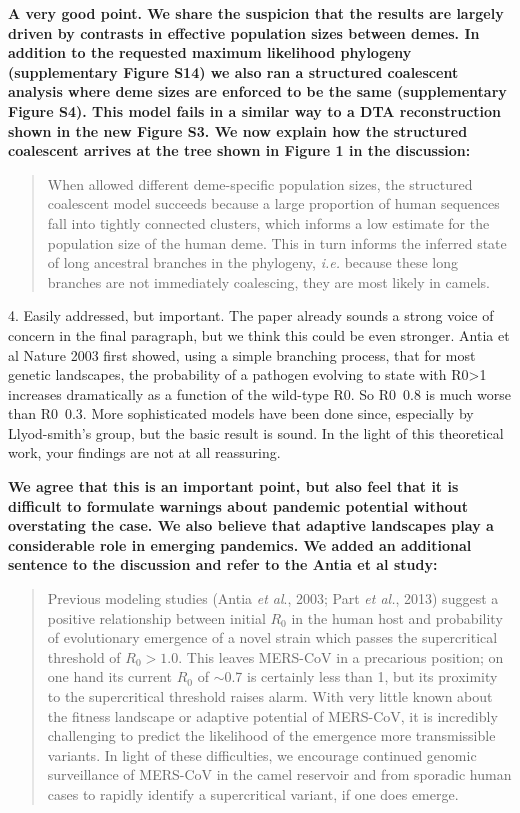 \documentclass[11pt,oneside,letterpaper]{article}
\begin{document}
\textbf{A very good point. We share the suspicion that the results are largely driven by contrasts in effective population sizes between demes. In addition to the requested maximum likelihood phylogeny (supplementary Figure S14) we also ran a structured coalescent analysis where deme sizes are enforced to be the same (supplementary Figure S4). This model fails in a similar way to a DTA reconstruction shown in the new Figure S3. We now explain how the structured coalescent arrives at the tree shown in Figure 1 in the discussion:}

\begin{quotation}
When allowed different deme-specific population sizes, the structured coalescent model succeeds because a large proportion of human sequences fall into tightly connected clusters, which informs a low estimate for the population size of the human deme. 
This in turn informs the inferred state of long ancestral branches in the phylogeny, \textit{i.e.} because these long branches are not immediately coalescing, they are most likely in camels.
\end{quotation}

4. Easily addressed, but important. The paper already sounds a strong voice of concern in the final paragraph, but we think this could be even stronger. Antia et al Nature 2003 first showed, using a simple branching process, that for most genetic landscapes, the probability of a pathogen evolving to state with R0>1 increases dramatically as a function of the wild-type R0. So R0~0.8 is much worse than R0~0.3. More sophisticated models have been done since, especially by Llyod-smith's group, but the basic result is sound. In the light of this theoretical work, your findings are not at all reassuring.

\textbf{We agree that this is an important point, but also feel that it is difficult to formulate warnings about pandemic potential without overstating the case. We also believe that adaptive landscapes play a considerable role in emerging pandemics. We added an additional sentence to the discussion and refer to the Antia et al study:}

\begin{quotation}
Previous modeling studies (Antia \textit{et al}., 2003; Part \textit{et al.}, 2013) suggest a positive relationship between initial $R_{0}$ in the human host and probability of evolutionary emergence of a novel strain which passes the supercritical threshold of $R_{0}>1.0$.
This leaves MERS-CoV in a precarious position; on one hand its current $R_{0}$ of $\sim$0.7 is certainly less than 1, but its proximity to the supercritical threshold raises alarm.
With very little known about the fitness landscape or adaptive potential of MERS-CoV, it is incredibly challenging to predict the likelihood of the emergence more transmissible variants.
In light of these difficulties, we encourage continued genomic surveillance of MERS-CoV in the camel reservoir and from sporadic human cases to rapidly identify a supercritical variant, if one does emerge.
\end{quotation}
\end{document}
